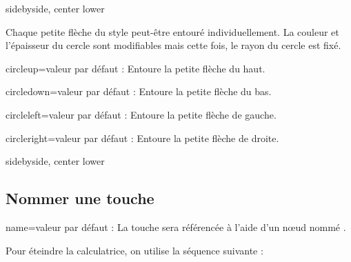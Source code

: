 \documentclass[10pt,french,a4paper]{article}
\begin{document}
\begin{dispExample*}{sidebyside, center lower}
\TiC[principal=$x^2$, second={\TiRacine}, circle=true, thickness=0.5pt]
\TiC[style=arrows, colour key=TIOrange, circle=true, radius=25pt, colour circle=blue]
\end{dispExample*}
\medbreak

Chaque petite flèche du style  peut-être entouré individuellement. La couleur et l'épaisseur du cercle sont modifiables mais cette fois, le rayon du cercle est fixé.

\begin{docKey}{circleup}{=}{valeur par défaut : }
Entoure la petite flèche du haut.
\end{docKey}

\begin{docKey}{circledown}{=}{valeur par défaut : }
Entoure la petite flèche du bas.
\end{docKey}

\begin{docKey}{circleleft}{=}{valeur par défaut : }
Entoure la petite flèche de gauche.
\end{docKey}

\begin{docKey}{circleright}{=}{valeur par défaut : }
Entoure la petite flèche de droite.
\end{docKey}

\begin{dispExample*}{sidebyside, center lower}
\TiC[style=arrows, colour key=TIOrange, circleup=true]
\TiC[style=arrows, colour key=TIOrange, circledown=true, colour circle=blue]
\TiC[style=arrows, colour key=TIOrange, circleleft=true, circleright=true, colour circle=purple]
\end{dispExample*}
\medbreak

\subsection{Nommer une touche}\label{subsec:NomTouche}

\begin{docKey}{name}{=}{valeur par défaut : }
    La touche sera référencée à l'aide d'un n{\oe}ud nommé .
\end{docKey}

\begin{dispExample}
Pour éteindre la calculatrice, on utilise la séquence suivante :
\begin{center}
    \TiC[principal=2nde, colour text=black, colour key=TIJaune]
    \TiC[principal=on, second=off, name=ON]
\end{center}
\end{dispExample}
\end{document}

